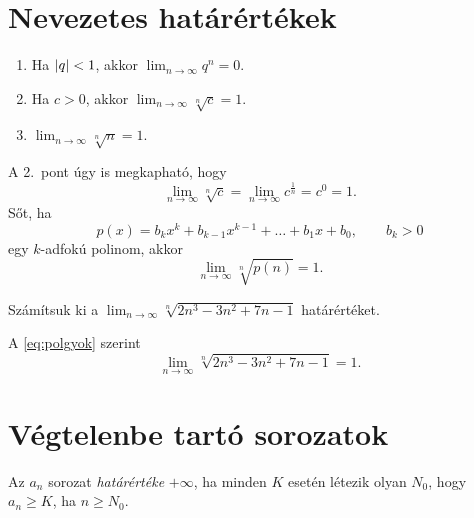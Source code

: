 \documentclass[11pt]{article}
\begin{document}
\section{Nevezetes határértékek}

\begin{thmbox}
\begin{theorem}\leavevmode
\begin{enumerate}[label=\arabic*.]
\item Ha $\left|q\right|<1$, akkor $\displaystyle\lim_{n\to\infty}q^{n}=0$.
\item Ha $c>0$, akkor $\displaystyle\lim_{n\to\infty}\sqrt[n]{c}=1$.
\item $\displaystyle\lim_{n\to\infty}\sqrt[n]{n}=1$.
\end{enumerate}
\end{theorem}
\end{thmbox}
A 2.\ pont úgy is megkapható, hogy
\[
\lim_{n\to\infty}\sqrt[n]{c}=\lim_{n\to\infty}c^{\frac{1}{n}}=c^{0}=1 .
\]
Sőt, ha
\[
p(x)=b_{k}x^{k}+b_{k-1}x^{k-1}+\dots+b_{1}x+b_{0},\qquad b_{k}>0
\]
egy $k$-adfokú polinom, akkor
\begin{equation}\label{eq:polgyok}
\lim_{n\to\infty}\sqrt[n]{p(n)}=1 .
\end{equation}

\begin{exbox}
\begin{example}
Számítsuk ki a $\displaystyle\lim_{n\to\infty}\sqrt[n]{2n^{3}-3n^{2}+7n-1}$ határértéket.
\end{example}
\end{exbox}
\begin{solution}
A \eqref{eq:polgyok} szerint
\[
\lim_{n\to\infty}\sqrt[n]{2n^{3}-3n^{2}+7n-1}=1 .
\]
\end{solution}

\section{Végtelenbe tartó sorozatok}

\begin{defbox}
\begin{definition}
Az $a_{n}$ sorozat \emph{határértéke} $+\infty$, ha minden $K$ esetén létezik olyan $N_{0}$, hogy $a_{n}\ge K$, ha $n\ge N_{0}$.
\end{definition}
\end{defbox}
\end{document}
